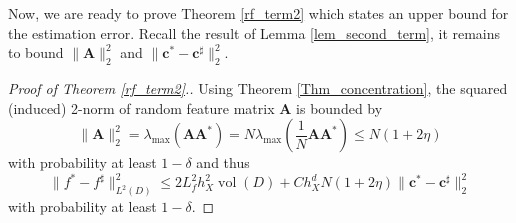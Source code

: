 \documentclass[11pt,twoside]{article}
\theoremstyle{plain}
\theoremstyle{definition}
\theoremstyle{remark}
\newcommand{\Ab}{\mathbf{A}}
\newcommand{\cb}{\mathbf{c}}
\newcommand{\vol}{\mathop{\mathrm{vol}}}
\begin{document}
Now, we are ready to prove Theorem \ref{rf_term2} which states an upper bound for the estimation error. Recall the result of Lemma \ref{lem_second_term}, it remains to bound $\|\Ab\|_2^2$ and $\|\cb^*-\cb^\sharp\|_2^2$.

\begin{proof}[Proof of Theorem \ref{rf_term2}.]
Using Theorem \ref{Thm_concentration}, the squared (induced) 2-norm of random feature matrix $\Ab$ is bounded by
\begin{equation}
\|\Ab\|_2^2 = \lambda_{\max}(\Ab\Ab^*) = N \lambda_{\max}\left(\frac{1}{N}\Ab\Ab^*\right) \leq N(1+2\eta)
\end{equation}
with probability at least $1-\delta$ and thus
\begin{equation*}
\| f^* - f^\sharp \|_{L^2(D)}^2 \leq 2L_f^2h_X^2\vol(D) + Ch_X^d N(1+2\eta) \| \cb^* - \cb^\sharp\|_2^2
\end{equation*}
with probability at least $1-\delta$.


\end{proof}
\end{document}
